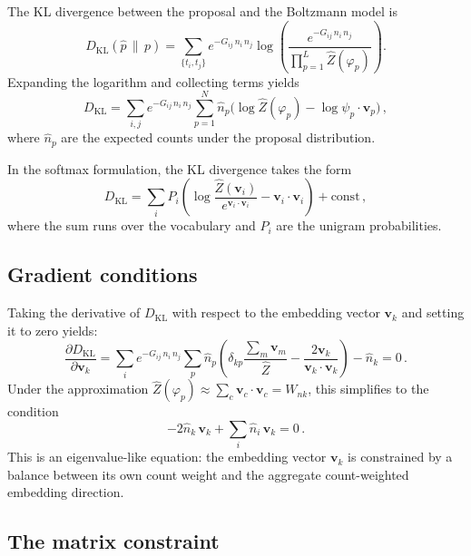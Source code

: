 \documentclass[11pt]{article}
\newcommand{\vw}{\bm{v}}
\newcommand{\KL}{D_{\mathrm{KL}}}
\begin{document}
The KL divergence between the proposal and the Boltzmann model is
\begin{equation}\label{eq:kl}
    \KL(\hat{p} \,\|\, p) = \sum_{\{t_i, t_j\}} e^{-G_{ij}\, n_i\, n_j} \log \left( \frac{e^{-G_{ij}\, n_i\, n_j}}{\prod_{p=1}^{L} \hat{Z}(\varphi_p)} \right).
\end{equation}
Expanding the logarithm and collecting terms yields
\begin{equation}\label{eq:kl-expanded}
    \KL = \sum_{i,j} e^{-G_{ij}\, n_i\, n_j} \sum_{p=1}^{N} \hat{n}_p \Big( \log \hat{Z}(\varphi_p) - \log \psi_p \cdot \vw_p \Big)\,,
\end{equation}
where $\hat{n}_p$ are the expected counts under the proposal distribution.

In the softmax formulation, the KL divergence takes the form
\begin{equation}\label{eq:kl-softmax}
    \KL = \sum_{i} P_i \left( \log \frac{\hat{Z}(\vw_i)}{e^{\vw_i \cdot \vw_i}} - \vw_i \cdot \vw_i \right) + \text{const}\,,
\end{equation}
where the sum runs over the vocabulary and $P_i$ are the unigram probabilities.

\subsection{Gradient conditions}\label{sec:gradient}

Taking the derivative of $\KL$ with respect to the embedding vector $\vw_k$ and setting it to zero yields:
\begin{equation}\label{eq:gradient}
    \frac{\partial \KL}{\partial \vw_k} = \sum_{i} e^{-G_{ij}\, n_i\, n_j} \sum_{p} \hat{n}_p \left( \delta_{kp} \frac{\sum_m \vw_m}{\hat{Z}} - \frac{2\vw_k}{\vw_k \cdot \vw_k} \right) - \hat{n}_k = 0\,.
\end{equation}
Under the approximation $\hat{Z}(\varphi_p) \approx \sum_c \vw_c \cdot \vw_c = W_{nk}$, this simplifies to the condition
\begin{equation}\label{eq:stationary}
    -2\hat{n}_k\, \vw_k + \sum_{i} \hat{n}_i\, \vw_k = 0\,.
\end{equation}
This is an eigenvalue-like equation: the embedding vector $\vw_k$ is constrained by a balance between its own count weight and the aggregate count-weighted embedding direction.

\subsection{The matrix constraint}\label{sec:matrix}
\end{document}
